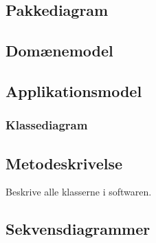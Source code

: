 \subsection{Pakkediagram}

\subsection{Domænemodel}
\begin{figure}[H]
\end{figure}

\subsection{Applikationsmodel}

%
\subsubsection{Klassediagram}

\subsection{Metodeskrivelse}
Beskrive alle klasserne i softwaren. 

\subsection{Sekvensdiagrammer}
